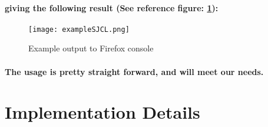 \paragraph{giving the following result (See reference figure: \ref{fig: exampleSJCL}):}

\begin{figure}[H]
\centering
\texttt{[image: exampleSJCL.png]}
\caption{\label{fig: exampleSJCL} Example output to Firefox console}
\end{figure}

\paragraph{The usage is pretty straight forward, and will meet our needs.}

\section{Implementation Details}

